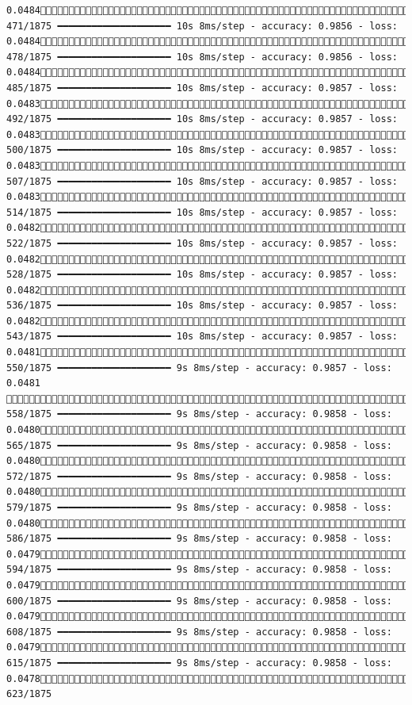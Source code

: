 \documentclass[
  letterpaper,
  DIV=11,
  numbers=noendperiod]{scrreprt}
\begin{document}
\begin{verbatim}
0.0484 471/1875 ━━━━━━━━━━━━━━━━━━━━ 10s 8ms/step - accuracy: 0.9856 - loss: 0.0484 478/1875 ━━━━━━━━━━━━━━━━━━━━ 10s 8ms/step - accuracy: 0.9856 - loss: 0.0484 485/1875 ━━━━━━━━━━━━━━━━━━━━ 10s 8ms/step - accuracy: 0.9857 - loss: 0.0483 492/1875 ━━━━━━━━━━━━━━━━━━━━ 10s 8ms/step - accuracy: 0.9857 - loss: 0.0483 500/1875 ━━━━━━━━━━━━━━━━━━━━ 10s 8ms/step - accuracy: 0.9857 - loss: 0.0483 507/1875 ━━━━━━━━━━━━━━━━━━━━ 10s 8ms/step - accuracy: 0.9857 - loss: 0.0483 514/1875 ━━━━━━━━━━━━━━━━━━━━ 10s 8ms/step - accuracy: 0.9857 - loss: 0.0482 522/1875 ━━━━━━━━━━━━━━━━━━━━ 10s 8ms/step - accuracy: 0.9857 - loss: 0.0482 528/1875 ━━━━━━━━━━━━━━━━━━━━ 10s 8ms/step - accuracy: 0.9857 - loss: 0.0482 536/1875 ━━━━━━━━━━━━━━━━━━━━ 10s 8ms/step - accuracy: 0.9857 - loss: 0.0482 543/1875 ━━━━━━━━━━━━━━━━━━━━ 10s 8ms/step - accuracy: 0.9857 - loss: 0.0481 550/1875 ━━━━━━━━━━━━━━━━━━━━ 9s 8ms/step - accuracy: 0.9857 - loss: 0.0481  558/1875 ━━━━━━━━━━━━━━━━━━━━ 9s 8ms/step - accuracy: 0.9858 - loss: 0.0480 565/1875 ━━━━━━━━━━━━━━━━━━━━ 9s 8ms/step - accuracy: 0.9858 - loss: 0.0480 572/1875 ━━━━━━━━━━━━━━━━━━━━ 9s 8ms/step - accuracy: 0.9858 - loss: 0.0480 579/1875 ━━━━━━━━━━━━━━━━━━━━ 9s 8ms/step - accuracy: 0.9858 - loss: 0.0480 586/1875 ━━━━━━━━━━━━━━━━━━━━ 9s 8ms/step - accuracy: 0.9858 - loss: 0.0479 594/1875 ━━━━━━━━━━━━━━━━━━━━ 9s 8ms/step - accuracy: 0.9858 - loss: 0.0479 600/1875 ━━━━━━━━━━━━━━━━━━━━ 9s 8ms/step - accuracy: 0.9858 - loss: 0.0479 608/1875 ━━━━━━━━━━━━━━━━━━━━ 9s 8ms/step - accuracy: 0.9858 - loss: 0.0479 615/1875 ━━━━━━━━━━━━━━━━━━━━ 9s 8ms/step - accuracy: 0.9858 - loss: 0.0478 623/1875 
\end{verbatim}
\end{document}
